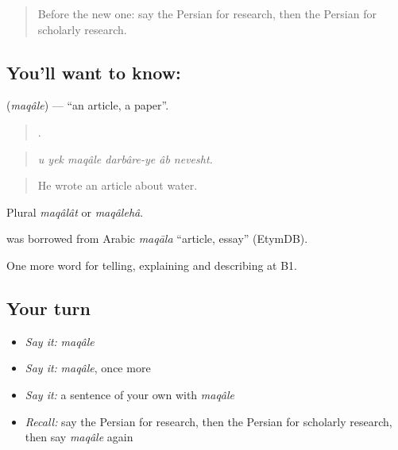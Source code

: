 \label{lesson:FA-C402-maqale}



\begin{quote}
Before the new one: say the Persian for research, then the Persian for scholarly research.
\end{quote}

\subsection*{You'll want to know: }
\textbf{} (\emph{maqâle}) — \textquotedblleft{}an article, a paper\textquotedblright{}.

\begin{quote}
     .
\end{quote}

\begin{quote}
\emph{u yek maqâle darbâre-ye âb nevesht.}
\end{quote}

\begin{quote}
He wrote an article about water.
\end{quote}

Plural \emph{maqâlât} or \emph{maqâlehâ}.

\begin{cousinweb}
\textbf{} was borrowed from Arabic \emph{maqāla} \textquotedblleft{}article, essay\textquotedblright{} (EtymDB).
\end{cousinweb}

\begin{grammarlens}[title={What you've built}]
One more word for telling, explaining and describing at B1.
\end{grammarlens}

\subsection*{Your turn}
\begin{itemize}
\raggedright
  \item \emph{Say it:} \emph{maqâle}
  \item \emph{Say it:} \emph{maqâle}, once more
  \item \emph{Say it:} a sentence of your own with \emph{maqâle}
  \item \emph{Recall:} say the Persian for research, then the Persian for scholarly research, then say \emph{maqâle} again
\end{itemize}

